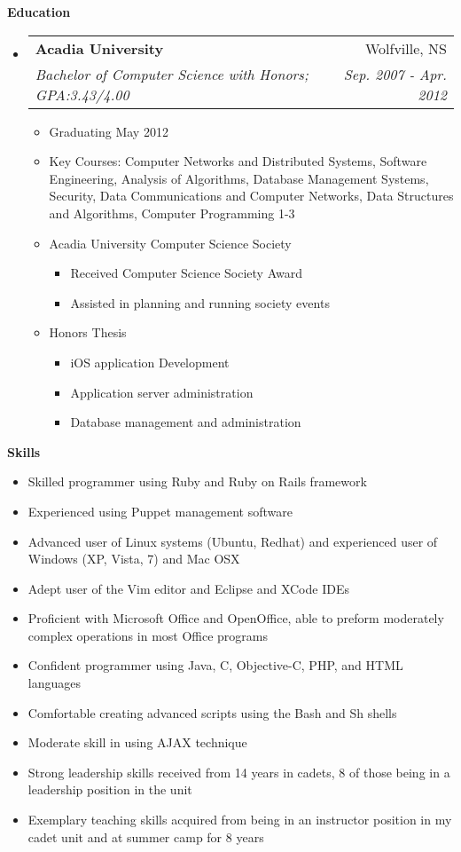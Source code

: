 \documentclass[letterpaper,11pt]{article}
\makeatletter
\newcommand{\resitem}[1]{\item #1 \vspace{-2pt}}
\newcommand{\resheading}[1]{{\large \colorbox{mygrey}{\begin{minipage}{\textwidth}{\textbf{#1 \vphantom{p\^{E}} }}\end{minipage}} }}
\newcommand{\ressubheading}[4]{
\begin{tabular*}{6.5in}{l@{\extracolsep{\fill}}r}
        \textbf{#1} & #2 \\
        \textit{#3} & \textit{#4} \\
\end{tabular*}\vspace{-6pt}}
\makeatother
\begin{document}
\resheading{Education} %
    \begin{itemize}
        \item[]
            \ressubheading{Acadia University}{Wolfville, NS}{{Bachelor of Computer Science with Honors}; {GPA:3.43/4.00}}{Sep. 2007 - Apr. 2012}
                \begin{itemize}
                    \resitem{Graduating May 2012}
                    \resitem{Key Courses: Computer Networks and Distributed Systems, Software Engineering, Analysis of
                    Algorithms, Database Management Systems, Security, Data Communications and Computer Networks, Data
                    Structures and Algorithms, Computer Programming 1-3}
                    \resitem{Acadia University Computer Science Society}
                        \begin{itemize}
                            \resitem{Received Computer Science Society Award}
                            \resitem{Assisted in planning and running society events}
                        \end{itemize}
                    \resitem{Honors Thesis} %
                        \begin{itemize}
                            \resitem{iOS application Development}
                            \resitem{Application server administration}
                            \resitem{Database management and administration}
                        \end{itemize}
                \end{itemize}
    \end{itemize}

\resheading{{Skills}} %
    \begin{itemize}
        \item Skilled programmer using Ruby and Ruby on Rails framework
        \item Experienced using Puppet management software
        \item Advanced user of Linux systems (Ubuntu, Redhat) and experienced user of Windows (XP, Vista, 7) and Mac OSX
        \item Adept user of the Vim editor and Eclipse and XCode IDEs
        \item Proficient with Microsoft Office and OpenOffice, able to preform moderately complex operations in most Office programs
        \item Confident programmer using Java, C, Objective-C, PHP, and HTML languages
        \item Comfortable creating advanced scripts using the Bash and Sh shells
        \item Moderate skill in using AJAX technique
        \item Strong leadership skills received from 14 years in cadets, 8 of those being in a leadership position in the unit
        \item Exemplary teaching skills acquired from being in an instructor position in my cadet unit and at summer camp for 8 years
    \end{itemize}
\end{document}
